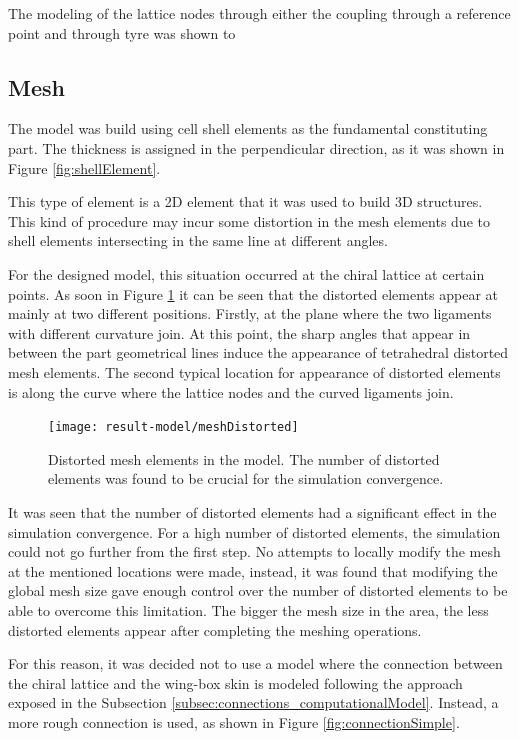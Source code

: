     The modeling of the lattice nodes through either the coupling through a reference point and through tyre was shown to 

  \subsection{Mesh} \label{subsec:mesh_results_model}

    The model was build using cell shell elements as the fundamental constituting part. The thickness is assigned in the perpendicular direction, as it was shown in Figure \ref{fig:shellElement}.

    This type of element is a 2D element that it was used to build 3D structures. This kind of procedure may incur some distortion in the mesh elements due to shell elements intersecting in the same line at different angles. 

    For the designed model, this situation occurred at the chiral lattice at certain points. As soon in Figure \ref{fig:meshDistorted} it can be seen that the distorted elements appear at mainly at two different positions. Firstly, at the plane where the two ligaments with different curvature join. At this point, the sharp angles that appear in between the part geometrical lines induce the appearance of tetrahedral distorted mesh elements. The second typical location for appearance of distorted elements is along the curve where the lattice nodes and the curved ligaments join.

    \begin{figure}[!htpb]
      \centering
      \texttt{[image: result-model/meshDistorted]}
      \caption[Distorted mesh elements in the model]{Distorted mesh elements in the model. The number of distorted elements was found to be crucial for the simulation convergence.}\label{fig:meshDistorted}
    \end{figure}

    It was seen that the number of distorted elements had a significant effect in the simulation convergence. For a high number of distorted elements, the simulation could not go further from the first step. No attempts to locally modify the mesh at the mentioned locations were made, instead, it was found that modifying the global mesh size gave enough control over the number of distorted elements to be able to overcome this limitation. The bigger the mesh size in the area, the less distorted elements appear after completing the meshing operations.

    For this reason, it was decided not to use a model where the connection between the chiral lattice and the wing-box skin is modeled following the approach exposed in the Subsection \ref{subsec:connections_computationalModel}. Instead, a more rough connection is used, as shown in Figure \ref{fig:connectionSimple}.

